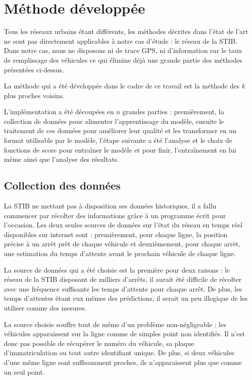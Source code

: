 \documentclass[letterpaper]{article}
\begin{document}
\section{Méthode développée}

Tous les réseaux urbains étant différents, les méthodes décrites dans l'état de l'art ne sont pas directement applicables à notre cas d'étude : le réseau de la STIB. Dans notre cas, nous ne disposons ni de trace GPS, ni d'information sur le taux de remplissage des véhicules ce qui élimine déjà une grande partie des méthodes présentées ci-dessus.

La méthode qui a été développée dans le cadre de ce travail est la méthode des $k$ plus proches voisins.


L'implémentation a été découpées en $n$ grandes parties : premièrement, la collection de données pour alimenter l'apprentissage du modèle, ensuite le traitement de ces données pour améliorer leur qualité et les transformer en un format utilisable par le modèle, l'étape suivante a été l'analyse et le choix de fonctions de score pour entraîner le modèle et pour finir, l’entraînement en lui même ainsi que l'analyse des résultats.

\subsection{Collection des données}

La STIB ne mettant pas à disposition ses données historiques, il a fallu commencer par récolter des informations grâce à un programme écrit pour l'occasion. Les deux seules sources de données sur l'état du réseau en temps réel disponibles sur internet sont : premièrement, pour chaque ligne, la position précise à un arrêt prêt de chaque véhicule et deuxièmement, pour chaque arrêt, une estimation du temps d'attente avant le prochain véhicule de chaque ligne.

La source de données qui a été choisie est la première pour deux raisons : le réseau de la STIB disposant de milliers d'arrêts, il aurait été difficile de récolter avec une fréquence suffisante les temps d'attente pour chaque arrêt. De plus, les temps d'attentes étant eux mêmes des prédictions, il serait un peu illogique de les utiliser comme des mesures.

La source choisie souffre tout de même d'un problème non-négligeable : les véhicules apparaissent sur la ligne comme de simples point non identifiés. Il n'est donc pas possible de récupérer le numéro du véhicule, sa plaque d'immatriculation ou tout autre identifiant unique. De plus, si deux véhicules d'une même ligne sont suffisamment proches, ils n'apparaissent plus que comme un seul point.
\end{document}
